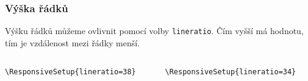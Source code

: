 \begin{frame}[fragile]
  \frametitle{Výška řádků}
  Výšku řádků můžeme ovlivnit pomocí volby \texttt{lineratio}. 
Čím vyšší má hodnotu, tím je vzdálenost mezi řádky menší.

\begin{columns}
  \begin{column}{0.5\textwidth}
\begin{verbatim}
\ResponsiveSetup{lineratio=38}
\end{verbatim}
\end{column}
  \begin{column}{0.5\textwidth}
\begin{verbatim}
\ResponsiveSetup{lineratio=34}
\end{verbatim}
\end{column}
\end{columns}

\end{frame}

\newcommand\printsize[1]{\csname #1\endcsname\par\noindent Sample\par}
\newcommand\showscale[2][.5\textwidth]{%
      \printsize{huge}
      \printsize{LARGE}
      \printsize{Large}
      \printsize{large}
      \hrule
      \printsize{normalsize}
      \hrule
      \printsize{small}
      \printsize{footnotesize}
}



